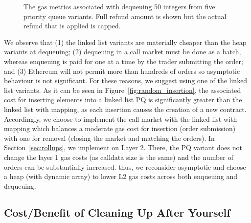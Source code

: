 \begin{figure}[t]
\begin{floatrow}
{\begin{tabular}{|>{\centering}m{2cm} |>{\centering}m{1.15cm} |>{\centering}m{1.15cm} |>{\centering\arraybackslash}m{0.2cm}|}
\end{tabular}
}{%
 \caption{\footnotesize{The gas metrics associated with dequeuing 50 integers from five priority queue variants. Full refund amount is shown but the actual refund that is applied is capped.}
\label{tab:PQUnitTests}}%
}
\end{floatrow}
\end{figure}









We observe that (1) the linked list variants are materially cheaper than the heap variants at dequeuing; (2) dequeuing in a call market must be done as a batch, whereas enqueuing is paid for one at a time by the trader submitting the order; and (3) Ethereum will not permit more than hundreds of orders so asymptotic behaviour is not significant. For these reasons, we suggest using one of the linked list variants. As it can be seen in Figure~\ref{fig:random_insertion}, the associated cost for inserting elements into a linked list PQ is significantly greater than the linked list with mapping, as each insertion causes the creation of a new contract. Accordingly, we choose to implement the call market with the linked list with mapping which balances a moderate gas cost for insertion (\ie order submission) with one for removal (\ie closing the market and matching the orders). In Section~\ref{sec:rollups}, we implement \cm on Layer 2. There, the PQ variant does not change the layer 1 gas costs (as calldata size is the same) and the number of orders can be substantially increased. thus, we reconsider asymptotic and choose a heap (with dynamic array) to lower L2 gas costs across both enqueuing and dequeuing.


\subsection{Cost/Benefit of Cleaning Up After Yourself}
\label{sec:gasrefund}



